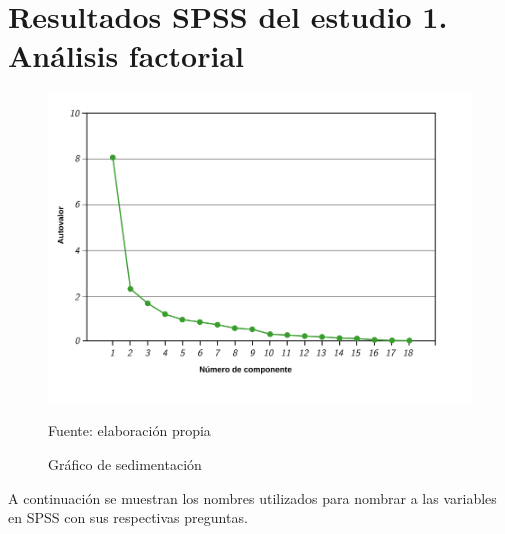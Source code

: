\chapter{Resultados SPSS del estudio 1. Análisis factorial}
\label{anexo:8}



\begin{figure}[!h]
	\caption{Gráfico de sedimentación}
	\centering \includegraphics[width=150mm]{capitulos/graficos/sedimentacion}
	\label{fig:sedimentacion}

		\footnotesize
		Fuente: elaboración propia
\end{figure}

\newpage



\newpage



A continuación se muestran los nombres utilizados para nombrar a las variables en SPSS con sus respectivas preguntas.

